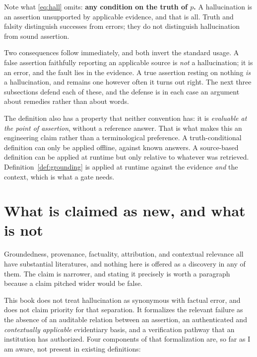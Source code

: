 Note what \eqref{eq:hall} omits: \textbf{any condition on the truth of $p$.} A
hallucination is an assertion unsupported by applicable evidence, and that is all.
Truth and falsity distinguish successes from errors; they do not distinguish
hallucination from sound assertion.

Two consequences follow immediately, and both invert the standard usage. A false
assertion faithfully reporting an applicable source is \emph{not} a hallucination;
it is an error, and the fault lies in the evidence. A true assertion resting on
nothing \emph{is} a hallucination, and remains one however often it turns out
right. The next three subsections defend each of these, and the defense is in each
case an argument about remedies rather than about words.

The definition also has a property that neither convention has: it is
\emph{evaluable at the point of assertion}, without a reference answer. That is what makes
this an engineering claim
rather than a terminological preference. A truth-conditional definition can only be
applied offline, against known answers. A source-based definition can be applied at
runtime but only relative to whatever was retrieved. Definition~\ref{def:grounding}
is applied at runtime against the evidence \emph{and} the context, which is what a
gate needs.

\section{What is claimed as new, and what is not}
\label{sec:novelty}

Groundedness, provenance, factuality, attribution, and contextual relevance all have
substantial literatures, and nothing here is offered as a discovery in any of them.
The claim is narrower, and stating it precisely is worth a paragraph because a claim
pitched wider would be false.

This book does not treat hallucination as synonymous with factual error, and does
not claim priority for that separation. It formalizes the relevant failure as the
absence of an auditable relation between an assertion, an authenticated and
\emph{contextually applicable} evidentiary basis, and a verification pathway that an
institution has authorized. Four components of that formalization are, so far as I am
aware, not present in existing definitions:

